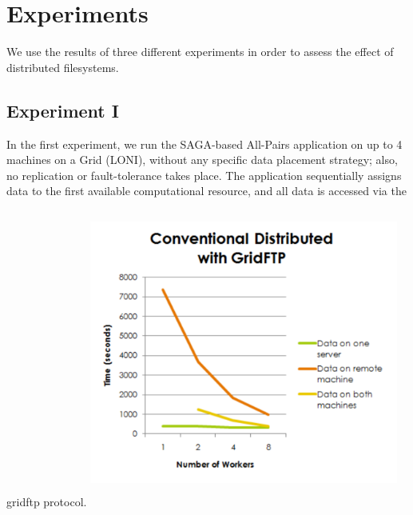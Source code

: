 \documentclass[a4paper,11pt]{article} \pagestyle{empty} \usepackage{amssymb}
\begin{document}
\section{Experiments}
We use the results of three different experiments in
order to assess the effect of distributed filesystems. 
\subsection{Experiment I}
In the first experiment, we run the SAGA-based All-Pairs application on up to 4
machines on a Grid (LONI), without any specific data placement strategy; also,
no replication or fault-tolerance takes place. The application sequentially
assigns data to the first available computational resource, and all data is
accessed via the gridftp protocol.
\includegraphics[width=4in,height=4in]{ConventionalDistributed.pdf}
\end{document}
